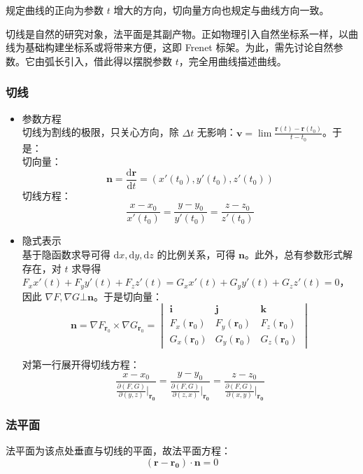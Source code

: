 \documentclass[12pt, a4paper, UTF8, openany]{ctexbook}
\newcommand{\dif}{\mathrm{d}}
\newcommand{\mat}[1]{\mathbf{#1}}
\begin{document}
        规定曲线的正向为参数 $t$ 增大的方向，切向量方向也规定与曲线方向一致。

        切线是自然的研究对象，法平面是其副产物。正如物理引入自然坐标系一样，以曲线为基础构建坐标系或将带来方便，这即 Frenet 标架。为此，需先讨论自然参数。它由弧长引入，借此得以摆脱参数 $t$，完全用曲线描述曲线。

        \subsubsection{切线}
        \begin{itemize}
            \item[-] 参数方程 \\
            切线为割线的极限，只关心方向，除 $\Delta t$ 无影响：$\mat{v} = \lim \frac{\mat{r}(t) - \mat{r}(t_0)}{t - t_0}$。于是：\\
            切向量：
            $$\mat{n} = \frac{\dif \mat{r}}{\dif t} = (x'(t_0), y'(t_0), z'(t_0))$$
            切线方程：
            $$\frac{x - x_0}{x'(t_0)} = \frac{y - y_0}{y'(t_0)} = \frac{z - z_0}{z'(t_0)}$$
            
            \item[-] 隐式表示 \\
            基于隐函数求导可得 $\dif x, \dif y, \dif z$ 的比例关系，可得 $\mat{n}$。此外，总有参数形式解存在，对 $t$ 求导得 $F_x x'(t) + F_y y'(t) + F_z z'(t) = G_x x'(t) + G_y y'(t) + G_z z'(t) = 0$，因此 $\nabla F, \nabla G \bot \mat{n}$。于是切向量：
            $$\mat{n} = \nabla F_{\mat{r}_0} \times \nabla G_{\mat{r}_0} = \begin{vmatrix}
                \mat{i} & \mat{j} & \mat{k} \\
                F_x(\mat{r}_0) & F_y(\mat{r}_0) & F_z(\mat{r}_0) \\
                G_x(\mat{r}_0) & G_y(\mat{r}_0) & G_z(\mat{r}_0)
            \end{vmatrix}$$

            对第一行展开得切线方程：
            $$\dfrac{x - x_0}{\frac{\partial (F, G)}{\partial (y, z)}|_{\mat{r_0}}} = \dfrac{y - y_0}{\frac{\partial (F, G)}{\partial (z, x)}|_{\mat{r_0}}} = \dfrac{z - z_0}{\frac{\partial (F, G)}{\partial (x, y)}|_{\mat{r_0}}}$$
        \end{itemize}

        \subsubsection{法平面}
        法平面为该点处垂直与切线的平面，故法平面方程：
        $$(\mat{r} - \mat{r_0}) \cdot \mat{n} = 0$$
\end{document}
